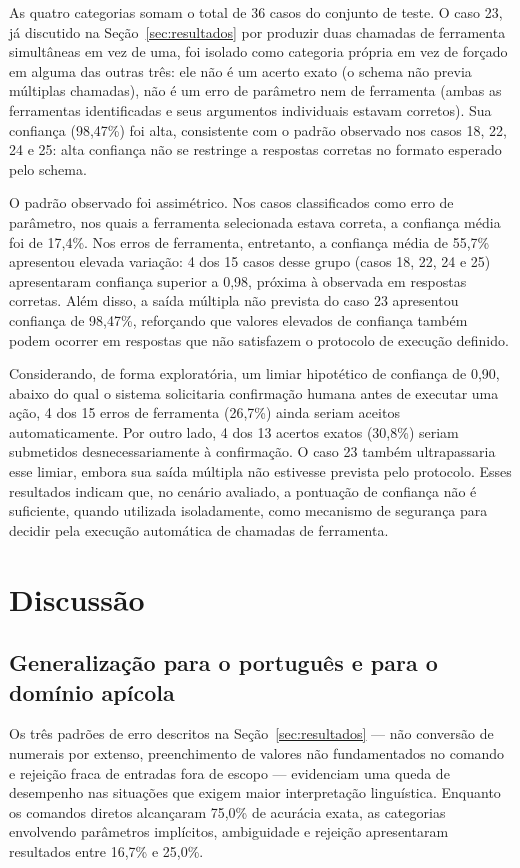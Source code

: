 \documentclass[12pt]{article}
\begin{document}
As quatro categorias somam o total de 36 casos do conjunto de teste. O
caso 23, já discutido na Seção~\ref{sec:resultados} por produzir duas
chamadas de ferramenta simultâneas em vez de uma, foi isolado como
categoria própria em vez de forçado em alguma das outras três: ele não é
um acerto exato (o schema não previa múltiplas chamadas), não é um erro
de parâmetro nem de ferramenta (ambas as ferramentas identificadas e seus
argumentos individuais estavam corretos). Sua confiança (98,47\%) foi
alta, consistente com o padrão observado nos casos 18, 22, 24 e 25: alta
confiança não se restringe a respostas corretas no formato esperado pelo
schema.

O padrão observado foi assimétrico. Nos casos classificados como erro de
parâmetro, nos quais a ferramenta selecionada estava correta, a confiança
média foi de 17,4\%. Nos erros de ferramenta, entretanto, a confiança
média de 55,7\% apresentou elevada variação: 4 dos 15 casos desse grupo
(casos 18, 22, 24 e 25) apresentaram confiança superior a 0,98, próxima
à observada em respostas corretas. Além disso, a saída múltipla não
prevista do caso 23 apresentou confiança de 98,47\%, reforçando que
valores elevados de confiança também podem ocorrer em respostas que não
satisfazem o protocolo de execução definido.

Considerando, de forma exploratória, um limiar hipotético de confiança de
0,90, abaixo do qual o sistema solicitaria confirmação humana antes de
executar uma ação, 4 dos 15 erros de ferramenta (26,7\%) ainda seriam
aceitos automaticamente. Por outro lado, 4 dos 13 acertos exatos (30,8\%)
seriam submetidos desnecessariamente à confirmação. O caso 23 também
ultrapassaria esse limiar, embora sua saída múltipla não estivesse prevista pelo protocolo. Esses resultados indicam que, no cenário avaliado, a pontuação de confiança não é suficiente, quando utilizada isoladamente, como mecanismo de segurança para decidir pela execução automática de chamadas de ferramenta.



\section{Discussão}
\label{sec:discussao}
\subsection{Generalização para o português e para o domínio apícola}

Os três padrões de erro descritos na Seção~\ref{sec:resultados} --- não
conversão de numerais por extenso, preenchimento de valores não
fundamentados no comando e rejeição fraca de entradas fora de escopo ---
evidenciam uma queda de desempenho nas situações que exigem maior
interpretação linguística. Enquanto os comandos diretos alcançaram
75,0\% de acurácia exata, as categorias envolvendo parâmetros implícitos,
ambiguidade e rejeição apresentaram resultados entre 16,7\% e 25,0\%.
\end{document}
